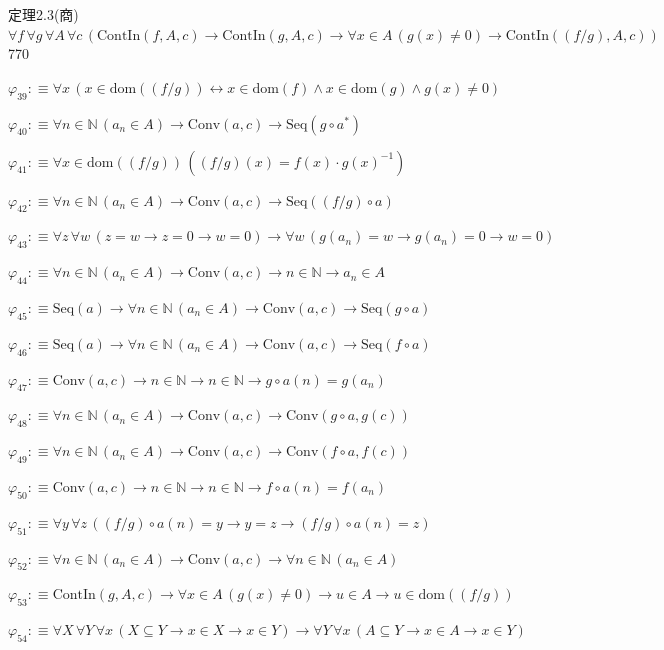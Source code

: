 \begin{fullproof}{定理2.3(商)}{$\forall f\,\forall g\,\forall A\,\forall c\,(\mathrm{ContIn}(f,A,c) \to \mathrm{ContIn}(g,A,c) \to \forall x \in A\,(g(x) \neq 0) \to \mathrm{ContIn}((f / g),A,c))$}{770}
\begin{abbrevlist}
\item $\varphi_{39} :\equiv \forall x\,(x \in \mathrm{dom}((f / g)) \leftrightarrow x \in \mathrm{dom}(f) \land x \in \mathrm{dom}(g) \land g(x) \neq 0)$
\item $\varphi_{40} :\equiv \forall n \in \mathbb{N}\,(a_{n} \in A) \to \mathrm{Conv}(a,c) \to \mathrm{Seq}(g \circ a^{\ast})$
\item $\varphi_{41} :\equiv \forall x \in \mathrm{dom}((f / g))\,((f / g)(x) = f(x) \cdot g(x)^{-1})$
\item $\varphi_{42} :\equiv \forall n \in \mathbb{N}\,(a_{n} \in A) \to \mathrm{Conv}(a,c) \to \mathrm{Seq}((f / g) \circ a)$
\item $\varphi_{43} :\equiv \forall z\,\forall w\,(z = w \to z = 0 \to w = 0) \to \forall w\,(g(a_{n}) = w \to g(a_{n}) = 0 \to w = 0)$
\item $\varphi_{44} :\equiv \forall n \in \mathbb{N}\,(a_{n} \in A) \to \mathrm{Conv}(a,c) \to n \in \mathbb{N} \to a_{n} \in A$
\item $\varphi_{45} :\equiv \mathrm{Seq}(a) \to \forall n \in \mathbb{N}\,(a_{n} \in A) \to \mathrm{Conv}(a,c) \to \mathrm{Seq}(g \circ a)$
\item $\varphi_{46} :\equiv \mathrm{Seq}(a) \to \forall n \in \mathbb{N}\,(a_{n} \in A) \to \mathrm{Conv}(a,c) \to \mathrm{Seq}(f \circ a)$
\item $\varphi_{47} :\equiv \mathrm{Conv}(a,c) \to n \in \mathbb{N} \to n \in \mathbb{N} \to g \circ a(n) = g(a_{n})$
\item $\varphi_{48} :\equiv \forall n \in \mathbb{N}\,(a_{n} \in A) \to \mathrm{Conv}(a,c) \to \mathrm{Conv}(g \circ a,g(c))$
\item $\varphi_{49} :\equiv \forall n \in \mathbb{N}\,(a_{n} \in A) \to \mathrm{Conv}(a,c) \to \mathrm{Conv}(f \circ a,f(c))$
\item $\varphi_{50} :\equiv \mathrm{Conv}(a,c) \to n \in \mathbb{N} \to n \in \mathbb{N} \to f \circ a(n) = f(a_{n})$
\item $\varphi_{51} :\equiv \forall y\,\forall z\,((f / g) \circ a(n) = y \to y = z \to (f / g) \circ a(n) = z)$
\item $\varphi_{52} :\equiv \forall n \in \mathbb{N}\,(a_{n} \in A) \to \mathrm{Conv}(a,c) \to \forall n \in \mathbb{N}\,(a_{n} \in A)$
\item $\varphi_{53} :\equiv \mathrm{ContIn}(g,A,c) \to \forall x \in A\,(g(x) \neq 0) \to u \in A \to u \in \mathrm{dom}((f / g))$
\item $\varphi_{54} :\equiv \forall X\,\forall Y\,\forall x\,(X \subseteq Y \to x \in X \to x \in Y) \to \forall Y\,\forall x\,(A \subseteq Y \to x \in A \to x \in Y)$

\end{abbrevlist}
\end{fullproof}

